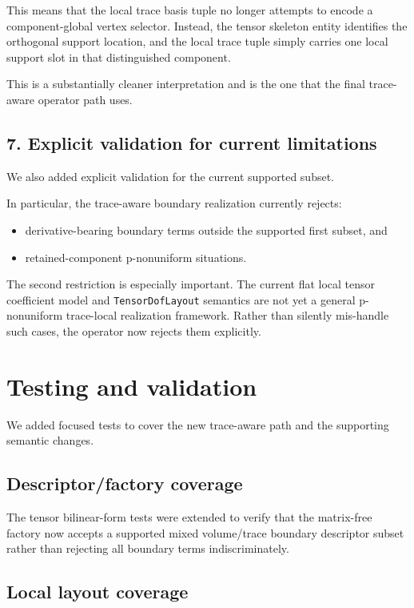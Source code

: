 \documentclass[11pt]{article}
\begin{document}
This means that the local trace basis tuple no longer attempts to encode a component-global vertex selector. Instead, the tensor skeleton entity identifies the orthogonal support location, and the local trace tuple simply carries one local support slot in that distinguished component.

This is a substantially cleaner interpretation and is the one that the final trace-aware operator path uses.

\subsection{7. Explicit validation for current limitations}

We also added explicit validation for the current supported subset.

In particular, the trace-aware boundary realization currently rejects:
\begin{itemize}[leftmargin=*]
  \item derivative-bearing boundary terms outside the supported first subset, and
  \item retained-component p-nonuniform situations.
\end{itemize}

The second restriction is especially important. The current flat local tensor coefficient model and \texttt{TensorDofLayout} semantics are not yet a general p-nonuniform trace-local realization framework. Rather than silently mis-handle such cases, the operator now rejects them explicitly.

\section{Testing and validation}

We added focused tests to cover the new trace-aware path and the supporting semantic changes.

\subsection{Descriptor/factory coverage}

The tensor bilinear-form tests were extended to verify that the matrix-free factory now accepts a supported mixed volume/trace boundary descriptor subset rather than rejecting all boundary terms indiscriminately.

\subsection{Local layout coverage}
\end{document}
